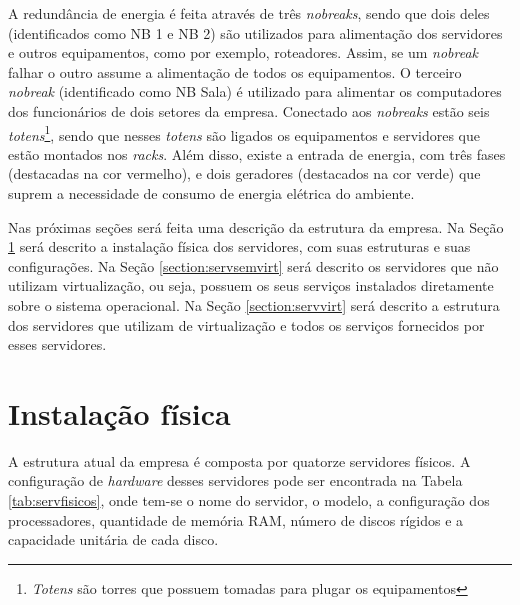 A redundância de energia é feita através de três \textit{nobreaks}, sendo que dois deles (identificados como NB 1 e NB 2) são utilizados para 
alimentação dos servidores e outros equipamentos, como por exemplo, roteadores. Assim, se um \textit{nobreak} falhar o outro assume a alimentação
de todos os equipamentos. O terceiro \textit{nobreak} (identificado como NB Sala) é utilizado para alimentar os computadores dos funcionários de 
dois setores da empresa. Conectado aos \textit{nobreaks} estão seis \textit{totens}\footnote[1]{\textit{Totens} são torres que possuem tomadas para plugar 
os equipamentos}, sendo que nesses \textit{totens} são ligados os equipamentos e servidores que estão montados nos \textit{racks}. 
Além disso, existe a entrada de energia, com três fases (destacadas na cor vermelho), e dois geradores (destacados na cor verde) que suprem a 
necessidade de consumo de energia elétrica do ambiente.

Nas próximas seções será feita uma descrição da estrutura da empresa. Na Seção \ref{section:fisico} será descrito a instalação física dos 
servidores, com suas estruturas e suas configurações. Na Seção \ref{section:servsemvirt} será descrito os servidores que não utilizam virtualização,
ou seja, possuem os seus serviços instalados diretamente sobre o sistema operacional. Na Seção \ref{section:servvirt} será descrito a estrutura 
dos servidores que utilizam de virtualização e todos os serviços fornecidos por esses servidores.

\section{Instalação física}
\label{section:fisico}

A estrutura atual da empresa é composta por quatorze servidores físicos. A configuração de \textit{hardware} desses servidores pode ser 
encontrada na Tabela \ref{tab:servfisicos}, onde tem-se o nome do servidor, o modelo, a configuração dos processadores, quantidade de memória
\ac{RAM}, número de discos rígidos e a capacidade unitária de cada disco.

